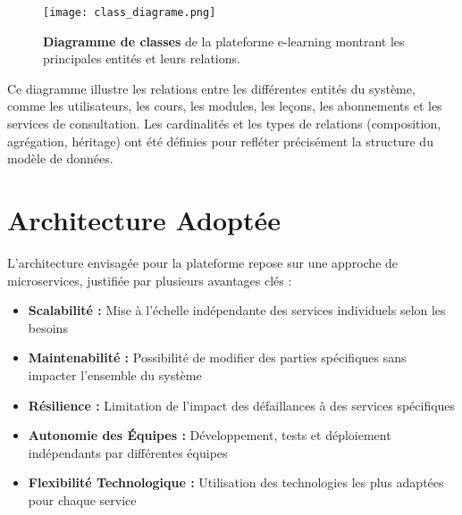 \begin{figure}[h!]
  \centering
  \texttt{[image: class\_diagrame.png]}
  \caption{\textbf{Diagramme de classes} de la plateforme e-learning montrant les principales entités et leurs relations.}
  \label{fig:class_diagram}
\end{figure}

Ce diagramme illustre les relations entre les différentes entités du système, comme les utilisateurs, les cours, les modules, les leçons, les abonnements et les services de consultation. Les cardinalités et les types de relations (composition, agrégation, héritage) ont été définies pour refléter précisément la structure du modèle de données.

\section{Architecture Adoptée}

L'architecture envisagée pour la plateforme repose sur une approche de microservices, justifiée par plusieurs avantages clés :
\begin{itemize}
  \item \textbf{Scalabilité :} Mise à l'échelle indépendante des services individuels selon les besoins
  \item \textbf{Maintenabilité :} Possibilité de modifier des parties spécifiques sans impacter l'ensemble du système
  \item \textbf{Résilience :} Limitation de l'impact des défaillances à des services spécifiques
  \item \textbf{Autonomie des Équipes :} Développement, tests et déploiement indépendants par différentes équipes
  \item \textbf{Flexibilité Technologique :} Utilisation des technologies les plus adaptées pour chaque service
\end{itemize}

